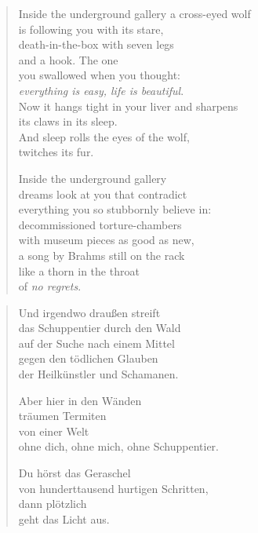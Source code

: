 \begin{verse}

Inside the underground gallery a cross-eyed wolf\\
is following you with its stare,\\
death-in-the-box with seven legs\\
and a hook. The one\\
you swallowed when you thought:\\
\emph{everything is easy, life is beautiful}.\\
Now it hangs tight in your liver and sharpens\\
its claws in its sleep.\\
And sleep rolls the eyes of the wolf,\\
twitches its fur.

Inside the underground gallery\\
dreams look at you that contradict\\
everything you so stubbornly believe in:\\
decommissioned torture-chambers\\
with museum pieces as good as new,\\
a song by Brahms still on the rack\\
like a thorn in the throat\\
of \emph{no regrets}.

\end{verse}

\clearpage

\begin{verse}

Und irgendwo draußen streift\\
das Schuppentier durch den Wald\\
auf der Suche nach einem Mittel\\
gegen den tödlichen Glauben\\
der Heilkünstler und Schamanen.

Aber hier in den Wänden\\
träumen Termiten\\
von einer Welt\\
ohne dich, ohne mich, ohne Schuppentier.

Du hörst das Geraschel\\
von hunderttausend hurtigen Schritten,\\
dann plötzlich\\
geht das Licht aus.

\end{verse}

